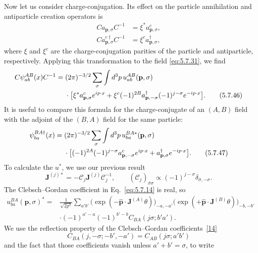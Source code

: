 Now let us consider charge-conjugation. Its effect on the particle annihilation
and antiparticle creation operators is
\begin{align}
C a_{\mathbf p,\sigma}C^{-1}&=\xi^*a^c_{\mathbf p,\sigma},
\tag{5.7.44}\label{eq:5.7.44}\\
C a^{c\dagger}_{\mathbf p,\sigma}C^{-1}&=\xi^c a^\dagger_{\mathbf p,\sigma},
\tag{5.7.45}\label{eq:5.7.45}
\end{align}
where $\xi$ and $\xi^c$ are the charge-conjugation parities of the particle
and antiparticle, respectively. Applying this transformation to the field
\eqref{eq:5.7.31}, we find
\begin{align}
C\psi^{AB}_{ab}(x)C^{-1}={}&(2\pi)^{-3/2}\sum_\sigma\int d^3p\,
u^{AB}_{ab}(\mathbf p,\sigma)
\notag\\
&\cdot\bigl[\xi^*a^c_{\mathbf p,\sigma}e^{ip\cdot x}
+\xi^c(-1)^{2B}a^\dagger_{\mathbf p,-\sigma}(-1)^{j-\sigma}
e^{-ip\cdot x}\bigr].
\tag{5.7.46}\label{eq:5.7.46}
\end{align}
It is useful to compare this formula for the charge-conjugate of an $(A,B)$
field with the adjoint of the $(B,A)$ field for the same particle:
\begin{align}
\psi^{BA\dagger}_{ba}(x)={}&(2\pi)^{-3/2}\sum_\sigma\int d^3p\,
u^{BA*}_{ba}(\mathbf p,\sigma)
\notag\\
&\cdot\bigl[(-1)^{2A}(-1)^{j-\sigma}a^c_{\mathbf p,-\sigma}e^{ip\cdot x}
+a^\dagger_{\mathbf p,\sigma}e^{-ip\cdot x}\bigr].
\tag{5.7.47}\label{eq:5.7.47}
\end{align}
To calculate the $u^*$, we use our previous result
\[
\mathbf J^{(j)*}=-\mathcal C_j\mathbf J^{(j)}\mathcal C_j^{-1},
\qquad (\mathcal C_j)_{\bar\sigma\sigma}\propto
(-1)^{j-\sigma}\delta_{\bar\sigma,-\sigma}.
\]
The Clebsch--Gordan coefficient in Eq.~\eqref{eq:5.7.14} is real, so
\begin{align*}
u^{BA}_{ba}(\mathbf p,\sigma)^*={}&\frac{1}{\sqrt{2p^0}}
\sum_{a'b'}
\bigl(\exp(-\widehat{\mathbf p}\cdot\mathbf J^{(A)}\theta)\bigr)_{-a,-a'}
\bigl(\exp(+\widehat{\mathbf p}\cdot\mathbf J^{(B)}\theta)\bigr)_{-b,-b'}
\\
&\cdot(-1)^{a'-a}(-1)^{b'-b}C_{BA}(j\sigma;b'a').
\end{align*}
We use the reflection property of the Clebsch--Gordan coefficients~\hyperref[ref:5.14]{[14]}
\begin{equation}
C_{BA}(j,-\sigma;-b',-a')=C_{AB}(j\sigma;a'b')
\tag{5.7.48}\label{eq:5.7.48}
\end{equation}
and the fact that those coefficients vanish unless $a'+b'=\sigma$, to write
